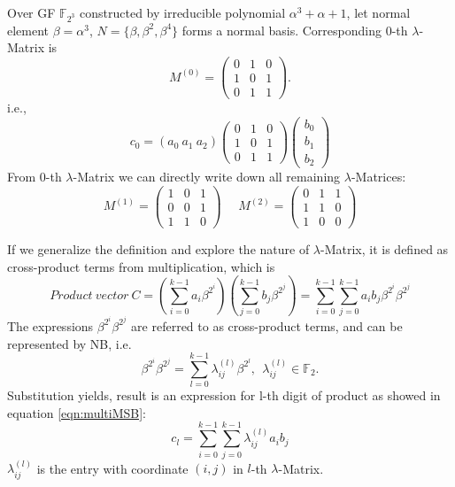 \begin{Example}
Over GF $\mathbb F_{2^3}$ constructed by irreducible polynomial $\alpha^3 + \alpha + 1$, let normal element $\beta = \alpha^3$, $N = \{ \beta, \beta^2, \beta^4\}$ 
forms a normal basis. Corresponding $0$-th $\lambda$-Matrix is
\begin{equation*}
M^{(0)} = \left(
\begin{array} {lcr}
0 & 1 & 0\\
1 & 0 & 1\\
0 & 1 & 1
\end{array} \right).
\end{equation*}
i.e.,
\begin{equation*}
c_0 = (a_0\  a_1\  a_2)\left(
\begin{array} {lcr}
0 & 1 & 0\\
1 & 0 & 1\\
0 & 1 & 1
\end{array} \right)\left(
\begin{array} {lcr}
b_0\\
b_1\\
b_2
\end{array} \right)
\end{equation*}
From $0$-th $\lambda$-Matrix we can directly write down all remaining $\lambda$-Matrices:
\begin{equation*}
M^{(1)} = \left(
\begin{array} {lcr}
1 & 0 & 1\\
0 & 0 & 1\\
1 & 1 & 0
\end{array} \right)~~~~~~
M^{(2)} = \left(
\begin{array} {lcr}
0 & 1 & 1\\
1 & 1 & 0\\
1 & 0 & 0
\end{array} \right)
\end{equation*}
\end{Example}

If we generalize the definition and explore the nature of $\lambda$-Matrix, it is defined as cross-product terms from multiplication, which is 
\begin{equation}
Product~vector~C = (\sum_{i=0}^{k-1}a_i\beta^{2^i})(\sum_{j=0}^{k-1}b_j\beta^{2^j}) = \sum_{i=0}^{k-1}\sum_{j=0}^{k-1}a_ib_j\beta^{2^i}\beta^{2^j}
\end{equation}
The expressions $\beta^{2^i}\beta^{2^j}$ are referred to as cross-product terms, and can be represented by
NB, i.e.
\begin{equation}
\beta^{2^i}\beta^{2^j} = \sum_{l=0}^{k-1}\lambda_{ij}^{(l)}\beta^{2^l}, \ \ \lambda_{ij}^{(l)} \in \mathbb F_2.
\end{equation}
Substitution yields, result is an expression for l-th digit of product as showed in equation \ref{eqn:multiMSB}:
\begin{equation}
c_l = \sum_{i=0}^{k-1}\sum_{j=0}^{k-1}\lambda_{ij}^{(l)}a_ib_j
\end{equation}
$\lambda_{ij}^{(l)}$ is the entry with coordinate $(i,j)$ in $l$-th $\lambda$-Matrix.

